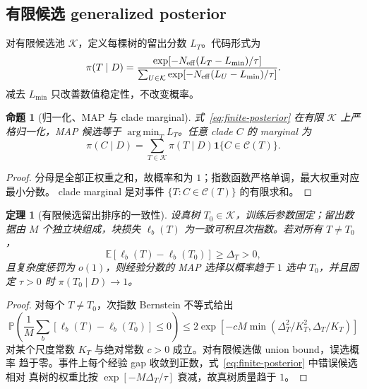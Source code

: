 \documentclass[UTF8,11pt]{ctexart}
\newtheorem{theorem}[definition]{定理}
\newtheorem{proposition}[definition]{命题}
\newcommand{\Pbb}{\mathbb P}
\newcommand{\Ebb}{\mathbb E}
\newcommand{\Ccal}{\mathcal C}
\newcommand{\argmin}{\operatorname*{arg\,min}}
\begin{document}
\subsection{有限候选 generalized posterior}

对有限候选池 $\mathcal K$，定义每棵树的留出分数 $L_T$。代码形式为
\begin{equation}
 \pi(T\mid D)=
 \frac{\exp[-N_{\rm eff}(L_T-L_{\min})/\tau]}
 {\sum_{U\in\mathcal K}\exp[-N_{\rm eff}(L_U-L_{\min})/\tau]}.
 \label{eq:finite-posterior}
\end{equation}
减去 $L_{\min}$ 只改善数值稳定性，不改变概率。

\begin{proposition}[归一化、MAP 与 clade marginal]
式~\eqref{eq:finite-posterior} 在有限 $\mathcal K$ 上严格归一化，MAP 候选等于
$\argmin_TL_T$。任意 clade $C$ 的 marginal 为
\begin{equation}
 \pi(C\mid D)=\sum_{T\in\mathcal K}\pi(T\mid D)\mathbf1\{C\in\Ccal(T)\}.
\end{equation}
\end{proposition}

\begin{proof}
分母是全部正权重之和，故概率和为 $1$；指数函数严格单调，最大权重对应最小分数。
clade marginal 是对事件 $\{T:C\in\Ccal(T)\}$ 的有限求和。
\end{proof}

\begin{theorem}[有限候选留出排序的一致性]
\label{thm:heldout-consistency}
设真树 $T_0\in\mathcal K$，训练后参数固定；留出数据由 $M$ 个独立块组成，块损失
$\ell_b(T)$ 为一致可积且次指数。若对所有 $T\ne T_0$，
\begin{equation}
 \Ebb[\ell_b(T)-\ell_b(T_0)]\ge\Delta_T>0,
 \label{eq:risk-gap}
\end{equation}
且复杂度惩罚为 $o(1)$，则经验分数的 MAP 选择以概率趋于 $1$ 选中 $T_0$，并且固定
$\tau>0$ 时 $\pi(T_0\mid D)\to1$。
\end{theorem}

\begin{proof}
对每个 $T\ne T_0$，次指数 Bernstein 不等式给出
\begin{equation*}
 \Pbb\!\left(\frac1M\sum_b[\ell_b(T)-\ell_b(T_0)]\le0\right)
 \le2\exp[-cM\min(\Delta_T^2/K_T^2,\Delta_T/K_T)]
\end{equation*}
对某个尺度常数 $K_T$ 与绝对常数 $c>0$ 成立。对有限候选做 union bound，误选概率
趋于零。事件上每个经验 gap 收敛到正数，式~\eqref{eq:finite-posterior} 中错误候选相对
真树的权重比按 $\exp[-M\Delta_T/\tau]$ 衰减，故真树质量趋于 $1$。
\end{proof}
\end{document}
